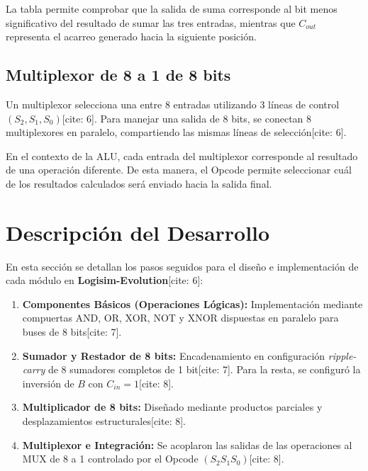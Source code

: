 \documentclass[12pt,a4paper]{article}
\begin{document}
La tabla permite comprobar que la salida de suma corresponde al bit menos significativo del resultado de sumar las tres entradas, mientras que $C_{out}$ representa el acarreo generado hacia la siguiente posición.

\subsection{Multiplexor de 8 a 1 de 8 bits}

Un multiplexor selecciona una entre 8 entradas utilizando 3 líneas de control $(S_2, S_1, S_0)$[cite: 6]. Para manejar una salida de 8 bits, se conectan 8 multiplexores en paralelo, compartiendo las mismas líneas de selección[cite: 6].

En el contexto de la ALU, cada entrada del multiplexor corresponde al resultado de una operación diferente. De esta manera, el Opcode permite seleccionar cuál de los resultados calculados será enviado hacia la salida final.

\section{Descripción del Desarrollo}

En esta sección se detallan los pasos seguidos para el diseño e implementación de cada módulo en \textbf{Logisim-Evolution}[cite: 6]:

\begin{enumerate}
    \item \textbf{Componentes Básicos (Operaciones Lógicas):} Implementación mediante compuertas AND, OR, XOR, NOT y XNOR dispuestas en paralelo para buses de 8 bits[cite: 7].
    
    \item \textbf{Sumador y Restador de 8 bits:} Encadenamiento en configuración \textit{ripple-carry} de 8 sumadores completos de 1 bit[cite: 7]. Para la resta, se configuró la inversión de $B$ con $C_{in} = 1$[cite: 8].
    
    \item \textbf{Multiplicador de 8 bits:} Diseñado mediante productos parciales y desplazamientos estructurales[cite: 8].
    
    \item \textbf{Multiplexor e Integración:} Se acoplaron las salidas de las operaciones al MUX de 8 a 1 controlado por el Opcode $(S_2 S_1 S_0)$[cite: 8].
\end{enumerate}
\end{document}
